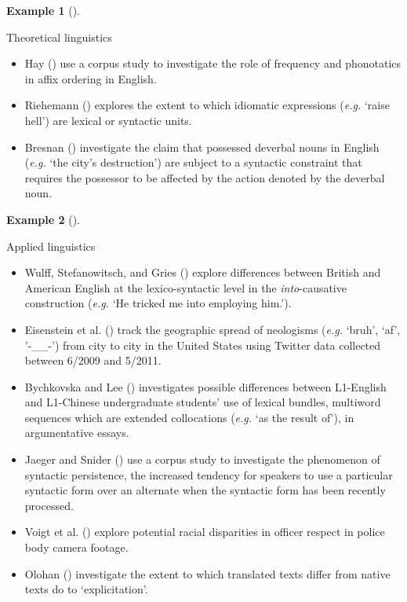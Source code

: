 \documentclass[
  letterpaper,
]{latex/krantz}
\providecommand{\tightlist}{%
  \setlength{\itemsep}{0pt}\setlength{\parskip}{0pt}}\usepackage{longtable,booktabs,array}
\theoremstyle{definition}
\newtheorem{example}{Example}[chapter]
\theoremstyle{remark}
\begin{document}
\begin{example}[]\protect\hypertarget{exm-linguistic-theory}{}\label{exm-linguistic-theory}

Theoretical linguistics

\begin{itemize}
\tightlist
\item
  Hay () use a corpus study to investigate
  the role of frequency and phonotatics in affix ordering in English.
\item
  Riehemann () explores the extent to
  which idiomatic expressions (\emph{e.g.} `raise hell') are lexical or
  syntactic units.
\item
  Bresnan () investigate the claim that
  possessed deverbal nouns in English (\emph{e.g.} `the city's
  destruction') are subject to a syntactic constraint that requires the
  possessor to be affected by the action denoted by the deverbal noun.
\end{itemize}

\end{example}

\begin{example}[]\protect\hypertarget{exm-linguistic-applied}{}\label{exm-linguistic-applied}

Applied linguistics

\begin{itemize}
\tightlist
\item
  Wulff, Stefanowitsch, and Gries ()
  explore differences between British and American English at the
  lexico-syntactic level in the \emph{into}-causative construction
  (\emph{e.g.} `He tricked me into employing him.').
\item
  Eisenstein et al. () track the
  geographic spread of neologisms (\emph{e.g.} `bruh', `af', '-\_\_-')
  from city to city in the United States using Twitter data collected
  between 6/2009 and 5/2011.
\item
  Bychkovska and Lee () investigates
  possible differences between L1-English and L1-Chinese undergraduate
  students' use of lexical bundles, multiword sequences which are
  extended collocations (\emph{e.g.} `as the result of'), in
  argumentative essays.
\item
  Jaeger and Snider () use a corpus study
  to investigate the phenomenon of syntactic persistence, the increased
  tendency for speakers to use a particular syntactic form over an
  alternate when the syntactic form has been recently processed.
\item
  Voigt et al. () explore potential racial
  disparities in officer respect in police body camera footage.
\item
  Olohan () investigate the extent to
  which translated texts differ from native texts do to `explicitation'.
\end{itemize}

\end{example}
\end{document}
